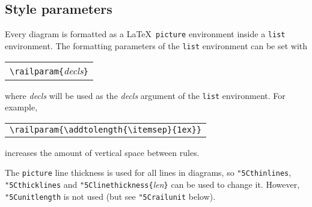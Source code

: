 \documentclass[a4paper]{article}
\newcommand\lit[1]{\texttt{#1}}
\newcommand\cs[1]{\lit{\char"5C\relax#1}}
\newenvironment{example}%
{\begin{trivlist}\item[]\begin{tabular}{l}}%
{\end{tabular}\end{trivlist}}
\begin{document}
\subsection{Style parameters}

Every diagram is formatted as a \LaTeX\ \lit{picture} environment inside a
\lit{list} environment. The formatting parameters of the \lit{list}
environment can be set with
\begin{example}
\verb!\railparam{!\textit{decls}\verb!}!
\end{example}
where \textit{decls} will be used as the \textit{decls} argument of the
\lit{list} environment. For example,
\begin{example}
\verb!\railparam{\addtolength{\itemsep}{1ex}}!
\end{example}
increases the amount of vertical space between rules.

The \lit{picture} line thickness is used for all lines in diagrams, so
\cs{thinlines}, \cs{thicklines} and
\cs{linethickness}\verb!{!\textit{len}\verb!}! can be used to change it.
However, \cs{unitlength} is not used (but see \cs{railunit} below).
\end{document}
